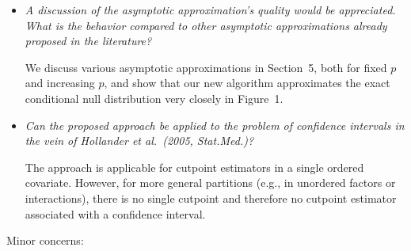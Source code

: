 \documentclass[11pt,a4paper]{article}
\begin{document}
\begin{itemize}
  \item \textit{A discussion of the asymptotic approximation's quality would be appreciated.
        What is the behavior compared to other asymptotic approximations already
        proposed in the literature?}
	
	We discuss various asymptotic approximations in Section~5, both for fixed $p$
	and increasing $p$, and show that our new algorithm approximates the exact
	conditional null distribution very closely in Figure~1.
	
  \item \textit{Can the proposed approach be applied to the problem of confidence
        intervals in the vein of Hollander et al.\ (2005, Stat.Med.)?}
	
	The approach is applicable for cutpoint estimators in a single ordered
        covariate. However, for more general partitions (e.g., in unordered factors
	or interactions), there is no single cutpoint and therefore no cutpoint
	estimator associated with a confidence interval.
	
\end{itemize}

Minor concerns:
\end{document}
